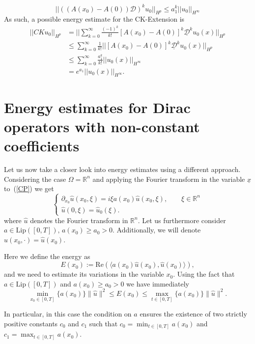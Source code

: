 \documentclass[12pt]{amsart}
\newcommand{\D}{\mathcal{D}}
\newcommand{\dnorm}[2]{||#1||_{#2}}
\newcommand{\hnorm}[2]{\dnorm{#1}{H^{#2}}}
\theoremstyle{definition}
\newcommand{\R}{\mathbb{R}}
\newcommand{\un}{\underline}
\begin{document}
\[
\hnorm{((A(x_0)-A(0))\D )^k u_0}{p}\leq a_1^k \hnorm{u_0}{\infty}
\]
As such, a possible energy estimate for the CK-Extension is 
\begin{align*}
\hnorm{CKu_0}{p}    &= \hnorm{\sum_{k = 0}^\infty \frac{(-1)^k}{k!}[A(x_0)-A(0)]^k\underline{\D}^ku_0(x)}{p}\\
        &\leq \sum_{k = 0}^\infty \frac{1}{k!}\hnorm{[A(x_0)-A(0)]^k\underline{\D}^ku_0(x)}{p} \\
        &\leq \sum_{k = 0}^\infty \frac{a_1^k}{k!}\hnorm{u_0(x)}{\infty}\\
        &= e^{a_1}\hnorm{u_0(x)}{\infty}.
\end{align*}
\section{Energy estimates for Dirac operators with non-constant coefficients}

Let us now take a closer look into energy estimates using a different approach. Considering the case $\Omega=\R^n$ and applying the Fourier transform in the variable $\un{x}$ to~(\ref{CP}) we get
\begin{equation}
\begin{cases}
\partial_{x_0}\hat{u}(x_0,\xi) = i\xi a(x_0)\hat{u}(x_0,\xi), \qquad \xi\in\R^n\\
\hat{u}(0,\xi) = \hat{u}_0(\xi).
\end{cases}
\label{eq3.4-td}
\end{equation}
where $\hat{u}$ denotes the Fourier transform in $\R^n$. Let us furthermore consider $a \in \text{Lip}([0, T]), \, a(x_0) \geq a_0 > 0$. Additionally, we will denote $\hat{u}(x_0,\cdot)=\hat{u}(x_0)$.

Here we define the energy as
\[
E(x_0) := \mathrm{Re}\left(\langle a(x_0)\hat{u}(x_0), \hat{u}(x_0) \rangle\right),
\]
and we need to estimate its variations in the variable $x_0$. Using the fact that $a \in \text{Lip}([0, T])$ and $a(x_0) \geq a_0 > 0$ we have immediately
\begin{equation}
\min_{x_0 \in [0,T]} \{a(x_0)\}\|\hat{u}\|^2\leq E(x_0) \leq \max_{t \in [0,T]} \{a(x_0)\} \|\hat{u}\|^2 .
\label{eq3.5-td}
\end{equation}

In particular, in this case the condition on $a$ ensures the existence of two strictly positive constants $c_0 $ and $ c_1 $ such that $ c_0 = \min_{t \in [0,T]} a(x_0) $ and $ c_1 = \max_{t \in [0,T]} a(x_0) $.
\end{document}
